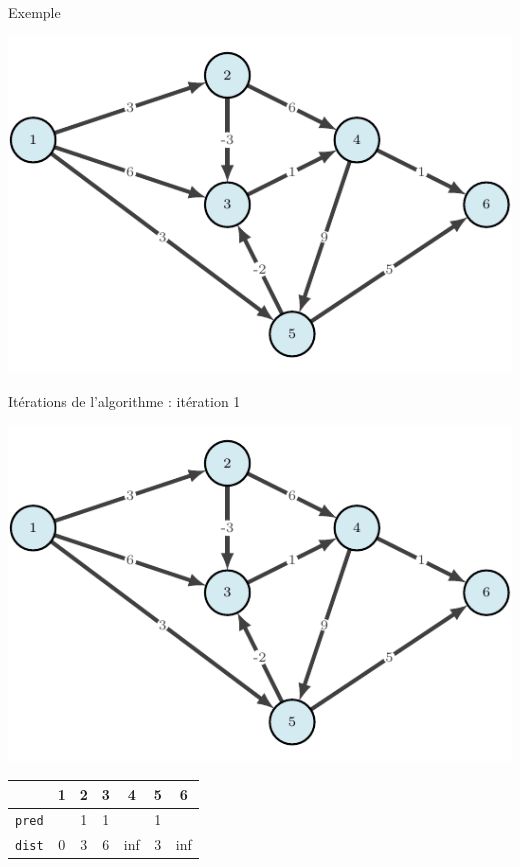 \begin{frame}{Exemple}
    \begin{center}
        \includegraphics[height=.6\textheight]{fig/bellmann-0.pdf}

    \end{center}
\end{frame}

\begin{frame}{Itérations de l'algorithme : itération 1}
    \begin{center}
        \includegraphics[height=.6\textheight]{fig/bellmann-0.pdf}      
    \begin{tabular}{c|cccccc}
      
        & 1    &2      &3      &4      &5      &6      \\
        \hline
        \texttt{pred} & &1      &1      &       &1      &       \\
        \texttt{dist} & 0       &3      &6      &inf    &3      &inf    \\

    \end{tabular}
\end{center}
\end{frame}

